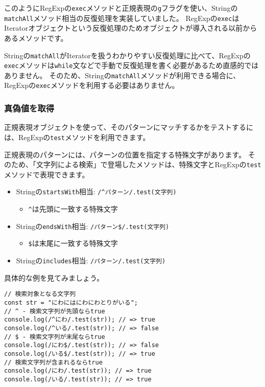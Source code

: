 \begin{tcolorbox}[enhanced jigsaw,breakable,title=RegExp.prototype.execでのString.prototype.matchAll]
このようにRegExpの\texttt{exec}メソッドと正規表現の\texttt{g}フラグを使い、Stringの\texttt{matchAll}メソッド相当の反復処理を実装していました。
RegExpの\texttt{exec}はIteratorオブジェクトという反復処理のためオブジェクトが導入される以前からあるメソッドです。

Stringの\texttt{matchAll}がIteratorを扱うわかりやすい反復処理に比べて、RegExpの\texttt{exec}メソッドは\texttt{while}文などで手動で反復処理を書く必要があるため直感的ではありません。
そのため、Stringの\texttt{matchAll}メソッドが利用できる場合に、RegExpの\texttt{exec}メソッドを利用する必要はありません。
\end{tcolorbox}

\hypertarget{test-by-regexp}{%
\subsubsection{真偽値を取得}\label{test-by-regexp}}

正規表現オブジェクトを使って、そのパターンにマッチするかをテストするには、RegExpの\texttt{test}メソッドを利用できます。

正規表現のパターンには、パターンの位置を指定する特殊文字があります。
そのため、「文字列による検索」で登場したメソッドは、特殊文字とRegExpの\texttt{test}メソッドで表現できます。

\begin{itemize}
\item
  Stringの\texttt{startsWith}相当:
  \texttt{/\^{}パターン/.test(文字列)}

  \begin{itemize}
  \item
    \texttt{\^{}}は先頭に一致する特殊文字
  \end{itemize}
\item
  Stringの\texttt{endsWith}相当:
  \texttt{/パターン\$/.test(文字列)}

  \begin{itemize}
  \item
    \texttt{\$}は末尾に一致する特殊文字
  \end{itemize}
\item
  Stringの\texttt{includes}相当:
  \texttt{/パターン/.test(文字列)}
\end{itemize}

具体的な例を見てみましょう。

\begin{lstlisting}
// 検索対象となる文字列
const str = "にわにはにわにわとりがいる";
// ^ - 検索文字列が先頭ならtrue
console.log(/^にわ/.test(str)); // => true
console.log(/^いる/.test(str)); // => false
// $ - 検索文字列が末尾ならtrue
console.log(/にわ$/.test(str)); // => false
console.log(/いる$/.test(str)); // => true
// 検索文字列が含まれるならtrue
console.log(/にわ/.test(str)); // => true
console.log(/いる/.test(str)); // => true
\end{lstlisting}

